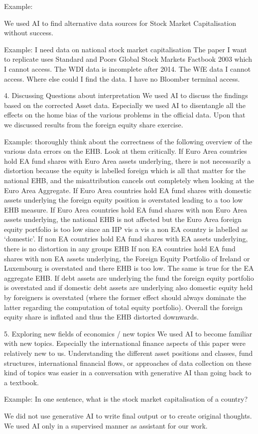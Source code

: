 \documentclass{article}
\begin{document}
    Example:
    

    We used AI to find alternative data sources for Stock Market Capitalisation without success.

    Example:
    I need data on national stock market capitalisation The paper I want to replicate uses Standard and Poors Global Stock Markets Factbook 2003 which I cannot access. The WDI data is
    incomplete after 2014. The WfE data I cannot access. Where else could I find the data. I have no Bloomber terminal access.

4. Discussing Questions about interpretation
    We used AI to discuss the findings based on the corrected Asset data. Especially we used AI to disentangle all the effects on the home bias of the various problems in the official data.
    Upon that we discussed results from the foreign equity share exercise. 

    Example:
    thoroughly think about the correctness of the following overview of the various data errors on the EHB. Look at them critically.
        If Euro Area countries hold EA fund shares with Euro Area assets underlying, there is not necessarily a distortion because the equity is labelled foreign which is all that matter for the national EHB, and the misattribution cancels out completely when looking at the Euro Area Aggregate.
        If Euro Area countries hold EA fund shares with domestic assets underlying the foreign equity position is overstated leading to a too low EHB measure.
        If Euro Area countries hold EA fund shares with non Euro Area assets underlying, the national EHB is not affected but the Euro Area foreign equity portfolio is too low since an IIP vis a vis a non EA country is labelled as `domestic’. 
        If non EA countries hold EA fund shares with EA assets underlying, there is no distortion in any groups EHB
        If non EA countries hold EA fund shares with non EA assets underlying, the Foreign Equity Portfolio of Ireland or Luxembourg is overstated and there EHB is too low. The same is true for the EA aggregate EHB.
        If debt assets are underlying the fund the foreign equity portfolio is overstated and if domestic debt assets are underlying also domestic equity held by foreigners is overstated (where the former effect should always dominate the latter regarding the computation of total equity portfolio). Overall the foreign equity share is inflated and thus the EHB distorted downwards.


5. Exploring new fields of economics / new topics
    We used AI to become familiar with new topics. Especially the international finance aspects of this paper were relatively new to us.
    Understanding the different asset positions and classes, fund structures, international financial flows, or approaches of data collection on these kind of topics
    was easier in a conversation with generative AI than going back to a textbook.

    Example:
    In one sentence, what is the stock market capitalisation of a country?


We did not use generative AI to write final output or to create original thoughts. We used AI only in a supervised manner as assistant for our work.
\end{document}
